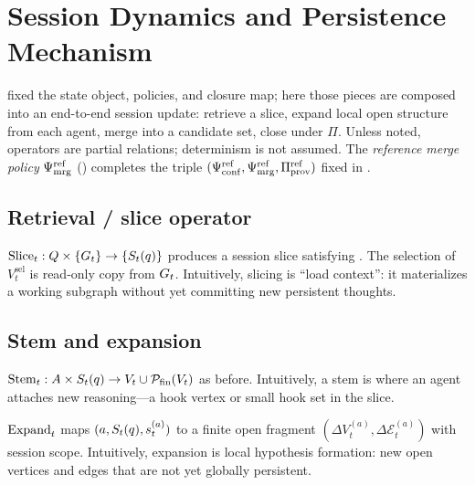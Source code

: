 \section{Session Dynamics and Persistence Mechanism}
\label{sec:session-persistence}

 fixed the state object, policies, and closure map; here those pieces are composed into an end-to-end session update: retrieve a slice, expand local open structure from each agent, merge into a candidate set, close under $\Pi$.
Unless noted, operators are partial relations; determinism is not assumed.
The \emph{reference merge policy} $\Psi_{\mathrm{mrg}}^{\mathrm{ref}}$ () completes the triple $(\Psi_{\mathrm{conf}}^{\mathrm{ref}},\Psi_{\mathrm{mrg}}^{\mathrm{ref}},\Pi_{\mathrm{prov}}^{\mathrm{ref}})$ fixed in .

\subsection{Retrieval / slice operator}
\label{sec:op-slice}

\begin{definition}
\label{def:slice-op}
$\mathrm{Slice}_t : Q \times \{G_t\} \to \{S_t(q)\}$ produces a session slice satisfying .
The selection of $V^{\mathrm{sel}}_t$ is read-only copy from $G_t$.
Intuitively, slicing is ``load context'': it materializes a working subgraph without yet committing new persistent thoughts.
\end{definition}

\subsection{Stem and expansion}
\label{sec:op-expand}

\begin{definition}
\label{def:stem}
$\mathrm{Stem}_t : A \times S_t(q) \to V_t \cup \mathcal{P}_{\mathrm{fin}}(V_t)$ as before.
Intuitively, a stem is where an agent attaches new reasoning---a hook vertex or small hook set in the slice.
\end{definition}

\begin{definition}
\label{def:expand-op}
$\mathrm{Expand}_t$ maps $(a,S_t(q),s^{(a)}_t)$ to a finite open fragment $(\Delta V^{(a)}_t,\Delta \mathcal{E}^{(a)}_t)$ with session scope.
Intuitively, expansion is local hypothesis formation: new open vertices and edges that are not yet globally persistent.
\end{definition}

